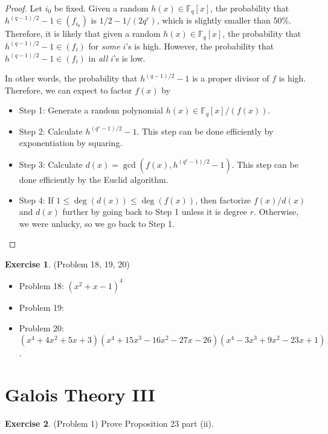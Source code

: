 \documentclass[12pt, psamsfonts]{amsart}
\theoremstyle{definition}
\newtheorem*{exer}{Exercise}
\theoremstyle{remark}
\numberwithin{equation}{section}
\begin{document}
\begin{proof}
  Let $i_0$ be fixed.
  Given a random $h(x) \in \mathbb{F}_q[x]$, the probability that $h^{(q - 1)/2} - 1 \in (f_{i_0})$ is $1/2 - 1/(2q^r)$, which is slightly smaller than 50\%.
  Therefore, it is likely that given a random $h(x) \in \mathbb{F}_q[x]$, the probability that $h^{(q - 1)/2} - 1 \in (f_i)$ for \textit{some} $i$'s is high.
  However, the probability that $h^{(q - 1)/2} - 1 \in (f_i)$ in \textit{all} $i$'s is low.

  In other words, the probability that $h^{(q - 1)/2} - 1$ is a proper divisor of $f$ is high.
  Therefore, we can expect to factor $f(x)$ by 

  \begin{itemize}
    \item
      Step 1: Generate a random polynomial $h(x) \in \mathbb{F}_q[x]/(f(x))$.
    \item
      Step 2: Calculate $h^{(q^r - 1)/2} - 1$.
      This step can be done efficiently by exponentiation by squaring.
    \item
      Step 3: Calculate $d(x) = \gcd(f(x), h^{(q^r - 1)/2} - 1)$.
      This step can be done efficiently by the Euclid algorithm.
    \item
      Step 4: If $1 \leq \deg(d(x)) \leq \deg(f(x))$, then factorize $f(x)/d(x)$ and $d(x)$ further by going back to Step 1 unless it is degree $r$.
      Otherwise, we were unlucky, so we go back to Step 1.
  \end{itemize}
\end{proof}

\begin{exer}{(Problem 18, 19, 20)}
  \begin{itemize}
    \item
      Problem 18: $(x^{2} + x - 1)^4$
    \item
      Problem 19:\todo[inline,caption={}]{
      }
    \item
      Problem 20: $(x^{4} + 4 x^{2} + 5 x + 3)(x^{4} + 15 x^{3} - 16 x^{2} - 27 x - 26)(x^{4} - 3 x^{3} + 9 x^{2} - 23 x + 1)$.
  \end{itemize}
\end{exer}

\section{Galois Theory III}

\begin{exer}{(Problem 1)}
  Prove Proposition 23 part (ii).
\end{exer}
\end{document}
